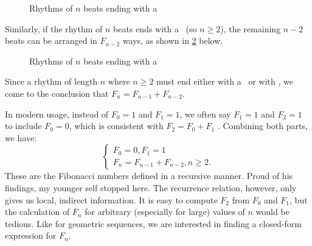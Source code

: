 \documentclass[a4paper, 12pt]{report}
\begin{document}
\begin{figure}[h]
    \centering
    \caption{Rhythms of $n$ beats ending with a \Vier}
    \label{fig:end_with_short}
\end{figure}

Similarly, if the rhythm of $n$ beats ends with a \Halb\ (so $n \geq 2$), the remaining $n - 2$ beats can be arranged in $F_{n - 2}$ ways, as shown in \cref{fig:end_with_long} below.

\begin{figure}[h]
    \centering
    \caption{Rhythms of $n$ beats ending with a \Halb}
    \label{fig:end_with_long}
\end{figure}

Since a rhythm of length $n$ where $n \geq 2$ must end either with a \Vier\ or with \Halb, we come to the conclusion that $F_n = F_{n - 1} + F_{n - 2}$.

In modern usage, instead of $F_0 = 1$ and $F_1 = 1$, we often say $F_1 = 1$ and $F_2 = 1$ to include $F_0 = 0$, which is consistent with $F_2 = F_0 + F_1$ \autocite[293]{gkp}. Combining both parts, we have:
\[\begin{cases}
F_0 = 0, F_1 = 1\\
F_n = F_{n - 1} + F_{n - 2}, n \geq 2.
\end{cases}\]
These are the Fibonacci numbers defined in a recursive manner. Proud of his findings, my younger self stopped here. The recurrence relation, however, only gives us local, indirect information. It is easy to compute $F_2$ from $F_0$ and $F_1$, but the calculation of $F_n$ for arbitrary (especially for large) values of $n$ would be tedious. Like for geometric sequences, we are interested in finding a closed-form expression for $F_n$.
\end{document}
